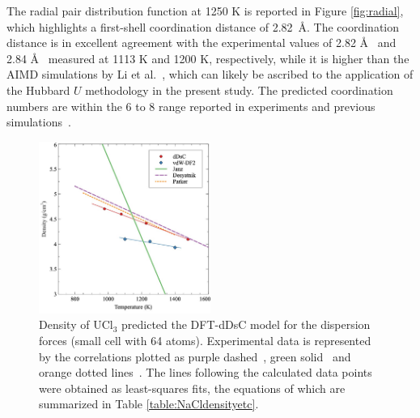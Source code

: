 \documentclass[preprint,3p,10pt,onecolumn,number,sort&compress]{elsarticle}
\begin{document}
{ 
The radial pair distribution function at 1250 K is reported in Figure \ref{fig:radial}, which highlights a first-shell coordination distance of 2.82~\AA. The coordination distance is in excellent agreement with the experimental values of 2.82 \AA~\cite{Neilson} and 2.84 \AA~\cite{Okamoto} measured at 1113 K and 1200 K, respectively, while it is higher than the AIMD simulations by Li et al.~\cite{Li}, which can likely be ascribed to the application of the Hubbard $U$ methodology in the present study. The predicted coordination numbers are within the 6 to 8 range reported in experiments and previous simulations~\cite{Li,Neilson,Okamoto}. %
 

\begin{figure}[htb]
\centering
\includegraphics[width=0.5\textwidth]{fig5.jpg}
\caption{Density of UCl$_3$ predicted the DFT-dDsC model for the dispersion forces (small cell with 64 atoms). Experimental data is represented by the correlations plotted as purple dashed~\cite{Desyatnik}, green solid~\cite{Janz1988} and orange dotted lines~\cite{Parker}. The lines following the calculated data points were obtained as least-squares fits, the equations of which are summarized in Table \ref{table:NaCldensityetc}.} %
\label{fig:UCl3density}
\end{figure}

}
\end{document}

